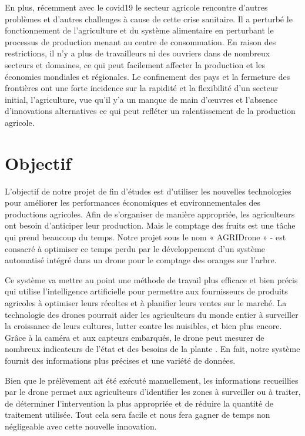 	En plus, récemment avec le covid19 le secteur agricole rencontre d’autres problèmes et d’autres challenges à cause de cette crise sanitaire. Il a perturbé le fonctionnement de l'agriculture et du système alimentaire en perturbant le processus de production menant au centre de consommation. En raison des restrictions, il n'y a plus de travailleurs ni des ouvriers dans de nombreux secteurs et domaines, ce qui peut facilement affecter la production et les économies mondiales et régionales. Le confinement des pays et la fermeture des frontières ont une forte incidence sur la rapidité et la flexibilité d’un secteur initial, l’agriculture, vue qu'il y'a un manque de main d'œuvres et l'absence d'innovations alternatives ce qui peut refléter un ralentissement de la production agricole.
	\section{Objectif }
	L'objectif de notre projet de fin d’études est d’utiliser les nouvelles technologies pour améliorer les performances économiques et environnementales des productions agricoles. Afin de s’organiser de manière appropriée, les agriculteurs ont besoin d’anticiper leur production. Mais le comptage des fruits est une tâche qui prend beaucoup du temps. Notre projet sous le nom « AGRIDrone » - est consacré à optimiser ce temps perdu par le développement d’un système automatisé intégré dans un drone pour le comptage des oranges sur l’arbre. 
	
	
	Ce système va mettre au point une méthode de travail plus efficace et bien précis qui utilise l’intelligence artificielle pour permettre aux fournisseurs de produits agricoles à optimiser leurs récoltes et à planifier leurs ventes sur le marché. La technologie des drones pourrait aider les agriculteurs du monde entier à surveiller la croissance de leurs cultures, lutter contre les nuisibles, et bien plus encore. Grâce à la caméra et aux capteurs embarqués, le drone peut mesurer de nombreux indicateurs de l'état et des besoins de la plante . En fait, notre système fournit des informations plus précises et une variété de données.
	
	Bien que le prélèvement ait été exécuté manuellement, les informations recueillies par le drone permet aux agriculteurs d'identifier les zones à surveiller ou à traiter, de déterminer l'intervention la plus appropriée et de réduire la quantité de traitement utilisée. Tout cela sera facile et nous fera gagner de temps non négligeable avec cette nouvelle innovation.
	
